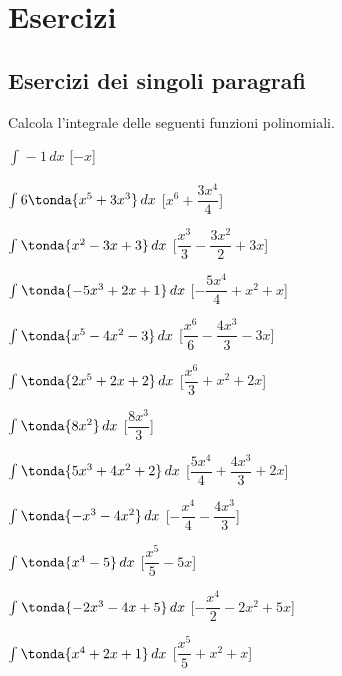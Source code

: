 

\section{Esercizi}

\subsection{Esercizi dei singoli paragrafi}

% 

\begin{esercizio}\label{ese: 1}
Calcola l'integrale delle seguenti funzioni polinomiali.
\begin{multicols}{2}
 \begin{enumeratea}
\item \(\int_{}^{}-1\, dx\) 
 \hfill [\(- x\)]
\item \(\int_{}^{}6 \tonda{x^{5} + 3 x^{3}}\, dx\) 
 \hfill [\(x^{6} + \dfrac{3 x^{4}}{4}\)]
\item \(\int_{}^{}\tonda{x^{2} - 3 x + 3}\, dx\) 
 \hfill [\(\dfrac{x^{3}}{3} - \dfrac{3 x^{2}}{2} + 3 x\)]
\item \(\int_{}^{}\tonda{- 5 x^{3} + 2 x + 1}\, dx\) 
 \hfill [\(- \dfrac{5 x^{4}}{4} + x^{2} + x\)]
\item \(\int_{}^{}\tonda{x^{5} - 4 x^{2} - 3}\, dx\) 
 \hfill [\(\dfrac{x^{6}}{6} - \dfrac{4 x^{3}}{3} - 3 x\)]
\item \(\int_{}^{}\tonda{2 x^{5} + 2 x + 2}\, dx\) 
 \hfill [\(\dfrac{x^{6}}{3} + x^{2} + 2 x\)]
\item \(\int_{}^{}\tonda{8 x^{2}}\, dx\) 
 \hfill [\(\dfrac{8 x^{3}}{3}\)]
\item \(\int_{}^{}\tonda{5 x^{3} + 4 x^{2} + 2}\, dx\) 
 \hfill [\(\dfrac{5 x^{4}}{4} + \dfrac{4 x^{3}}{3} + 2 x\)]
\item \(\int_{}^{}\tonda{- x^{3} - 4 x^{2}}\, dx\) 
 \hfill [\(- \dfrac{x^{4}}{4} - \dfrac{4 x^{3}}{3}\)]
\item \(\int_{}^{}\tonda{x^{4} - 5}\, dx\) 
 \hfill [\(\dfrac{x^{5}}{5} - 5 x\)]
\item \(\int_{}^{}\tonda{- 2 x^{3} - 4 x + 5}\, dx\) 
 \hfill [\(- \dfrac{x^{4}}{2} - 2 x^{2} + 5 x\)]
\item \(\int_{}^{}\tonda{x^{4} + 2 x + 1}\, dx\) 
\hfill [\(\dfrac{x^{5}}{5} + x^{2} + x\)]
 \end{enumeratea}
\end{multicols}
\end{esercizio}

